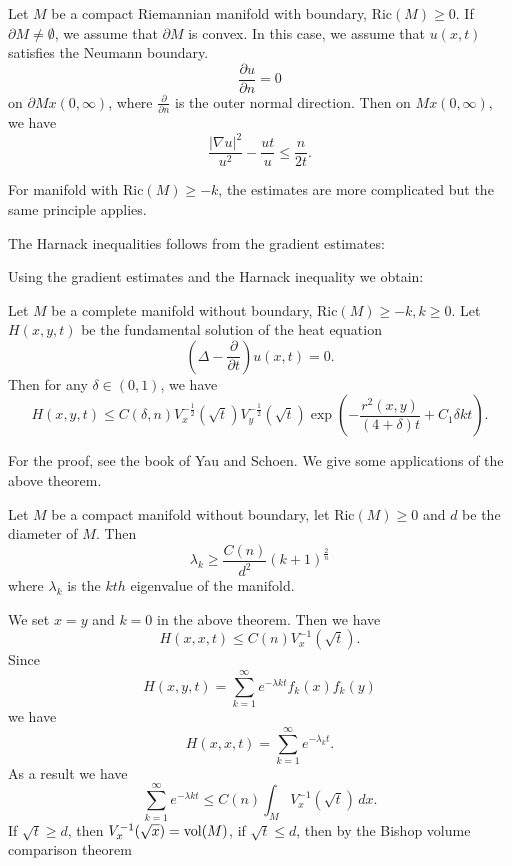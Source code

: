\begin{theorem} Let $M$ be a compact Riemannian manifold  with boundary, Ric$(M) \geq 0$. If $ \partial M \neq \emptyset $, we assume that $ \partial M $ is convex. In this case, we assume that $ u (x, t)$ satisfies the Neumann boundary.
%
\[ \frac{\partial u}{\partial n} = 0\]
%
on $ \partial M x (0, \infty) $, where $   \frac{\partial }{\partial n}  $ is the outer normal direction. Then on $ M x (0, \infty)$, we have 
%
\[ \frac{|\nabla u|^2}{u^2} - \frac{ut}{u} \leq \frac{n}{2t} .\]
\end{theorem}

For manifold with   Ric$(M) \geq - k $, the estimates are more complicated but the same principle applies.

The Harnack inequalities follows from the gradient estimates:

Using the gradient estimates and the Harnack inequality we obtain:

\begin{theorem}Let $ M$ be a complete manifold without boundary, Ric$(M) \geq - k , k \geq 0$. Let $ H (x, y, t) $ be the fundamental solution of the heat equation
%
\[ \left( \Delta - \frac{\partial }{\partial t} \right)  u (x, t) = 0 .\]
%
Then for any $ \delta \in (0, 1) $, we have 
%
\[H(x, y, t) \leq C(\delta, n) V^{-\frac{1}{2}} _x ( \sqrt{t}) V_y ^{-\frac{1}{2}} ( \sqrt{t}) \exp 
\left( - \frac{r^2 (x, y)}{(4 + \delta)t} + C_1 \delta k t\right) .\]
\end{theorem}

For the proof, see the book of Yau and Schoen. We give some applications of the above theorem.

\begin{theorem}[Gromov] Let $ M$ be a compact manifold without boundary, let   Ric$(M) \geq 0 $ and $ d$ be the diameter of $M$. Then 
%
\[ \lambda _k \geq \frac{C(n)}{d^2} ( k + 1)^{\frac{2}{n}} \]
%
where $ \lambda _k$ is the $kth$ eigenvalue of the manifold.
\end{theorem}

 We set $ x = y $ and $ k = 0 $ in the above theorem. Then we have
%
\[H(x, x, t) \leq C(n) V^{-1} _x (\sqrt{t}).\]
%
Since 
%
\[ H(x, y, t)= \sum^\infty_{k=1} e ^{-\lambda k t} f_k (x) f _k (y) \]
%
we have 
\[ H(x, x, t)= \sum^\infty_{k=1} e ^{-\lambda _{k} t} . \]
%
As a result we have 
\[ \sum^\infty_{k=1} e ^{-\lambda k t} \leq C(n) \int_M V^{-1} _x (\sqrt{t}) \, dx. \]
%
If $ \sqrt{t} \geq d $, then $  V^{-1} _x (\sqrt{x}) = {\rm vol} (M)$, if $ \sqrt{t} \leq d $, then 
by the Bishop volume comparison theorem 

